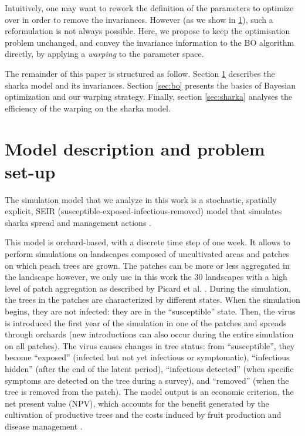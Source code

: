 Intuitively, one may want to rework the definition of the parameters to optimize over in order
to remove the invariances. However (as we show in \ref{sec:model}), such a reformulation is not always possible.
Here, we propose to keep the optimisation problem unchanged, and convey the invariance information to the BO algorithm directly, by applying 
a \textit{warping} \cite{snelson2004warped,snoek2014input} to the parameter space.

The remainder of this paper is structured as follow. Section \ref{sec:model} describes the sharka model and its invariances.
Section \ref{sec:bo} presents the basics of Bayesian optimization and our warping strategy. Finally, section \ref{sec:sharka}
analyses the efficiency of the warping on the sharka model.

\section{Model description and problem set-up}\label{sec:model}

The simulation model that we analyze in this work is a stochastic, spatially explicit, SEIR (susceptible-exposed-infectious-removed) model that simulates sharka spread and management actions 
\citep[including surveillance, removals and replantations][]{pleydell2018estimation,rimbaud2018using,rimbaud2018heuristic}.

This model is orchard-based, with a discrete time step of one week. It allows to perform simulations on landscapes composed of uncultivated areas and patches on which peach trees are grown. 
The patches can be more or less aggregated in the landscape however, we only use in this work the 30 landscapes with a high level of patch aggregation as described by Picard et al. \cite{picard2018}. 
During the simulation, the trees in the patches are characterized by different states. When the simulation begins, they are not infected: they are in the ``susceptible'' state. 
Then, the virus is introduced the first year of the simulation in one of the patches and spreads through orchards (new introductions can also occur during the entire simulation on all patches).
 The virus causes changes in tree status: from ``susceptible'', they become ``exposed'' (infected but not yet infectious or symptomatic), ``infectious hidden'' (after the end of the latent period), 
 ``infectious detected'' (when specific symptoms are detected on the tree during a survey), and ``removed'' (when the tree is removed from the patch). 
The model output is an economic criterion, the net present value (NPV), which accounts for the benefit generated by the cultivation of productive trees 
and the costs induced by fruit production and disease management \cite{rimbaud2018heuristic}.

